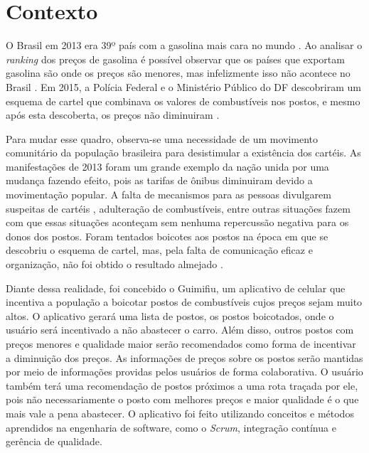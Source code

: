 \section{Contexto}

O Brasil em 2013 era 39º país com a gasolina mais cara no mundo \cite{oglobo}. Ao analisar o \textit{ranking} dos preços de gasolina é possível observar que os países que exportam gasolina são onde os preços são menores, mas infelizmente isso não acontece no Brasil \cite{ranking-precos}. Em 2015, a Polícia Federal e o Ministério Público do DF descobriram um esquema de cartel que combinava os valores de combustíveis nos postos, e mesmo após esta descoberta, os preços não diminuiram \cite{correio-cartel}.

Para mudar esse quadro, observa-se uma necessidade de um movimento comunitário da população brasileira para desistimular a existência dos cartéis. As manifestações de 2013 foram um grande exemplo da nação unida por uma mudança fazendo efeito, pois as tarifas de ônibus diminuiram devido a movimentação popular. A falta de mecanismos para as pessoas divulgarem suspeitas de cartéis \cite{manifestacoes-2013}, adulteração de combustíveis, entre outras situações fazem com que essas situações aconteçam sem nenhuma repercussão negativa para os donos dos postos. Foram tentados boicotes aos postos na época em que se descobriu o esquema de cartel, mas, pela falta de comunicação eficaz e organização, não foi obtido o resultado almejado \cite{boicotes-2016}.

Diante dessa realidade, foi concebido o Guimifiu, um aplicativo de celular que incentiva a população a boicotar postos de combustíveis cujos preços sejam muito altos. O aplicativo gerará uma lista de postos, os postos boicotados, onde o usuário será incentivado a não abastecer o carro. Além disso, outros postos com preços menores e qualidade maior serão recomendados como forma de incentivar a diminuição dos preços. As informações de preços sobre os postos serão mantidas por meio de informações providas pelos usuários de forma colaborativa. O usuário também terá uma recomendação de postos próximos a uma rota traçada por ele, pois não necessariamente o posto com melhores preços e maior qualidade é o que mais vale a pena abastecer. O aplicativo foi feito utilizando conceitos e métodos aprendidos na engenharia de software, como o \textit{Scrum}, integração contínua e gerência de qualidade.
